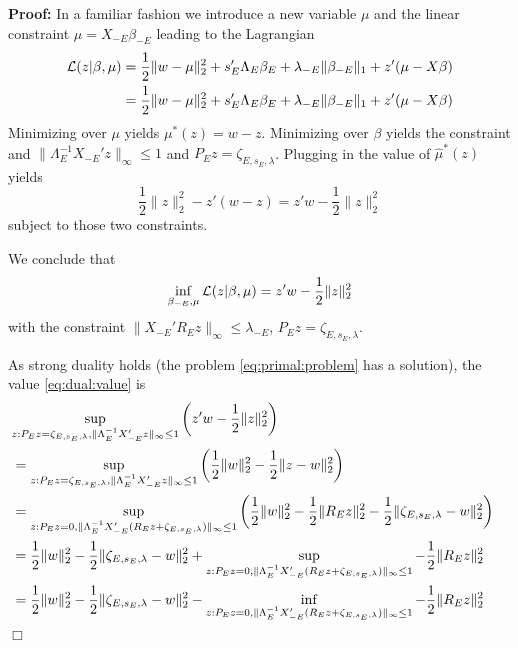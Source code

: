\documentclass{article}
\def\qed{\hfill $\Box$\newline}
\begin{document}
        {\bf Proof:} In a familiar fashion we introduce a new variable
        $\mu$ and the linear constraint $\mu=X_{-E}\beta_{-E}$ leading
        to the Lagrangian
        $$
        \begin{aligned}
        {\cal L}(z|\beta,\mu) &= \frac{1}{2} \|w-\mu\|^2_2 +
        s_E'\Lambda_E\beta_E + \lambda_{-E} \|\beta_{-E}\|_1 +
        z'(\mu-X\beta) \\ &= \frac{1}{2} \|w-\mu\|^2_2 +
        s_E'\Lambda_E\beta_E + \lambda_{-E} \|\beta_{-E}\|_1 +
        z'(\mu-X\beta) \\
        \end{aligned}
        $$ Minimizing over $\mu$ yields $\mu^*(z)=w-z$. Minimizing
        over $\beta$ yields the constraint and
        $\|\Lambda_E^{-1}X_{-E}'z\|_{\infty} \leq 1$ and
        $P_Ez=\zeta_{E,s_E,\lambda}$.  Plugging in the value of
        $\hat{\mu}^*(z)$ yields
        $$ \frac{1}{2}\|z\|^2_2 - z'(w-z) = z'w - \frac{1}{2}\|z\|^2_2
        $$ subject to those two constraints.

        We conclude that
        $$ \inf_{\beta_{-E},\mu}{\cal L}(z|\beta,\mu) = z'w -
        \frac{1}{2}\|z\|^2_2
        $$ with the constraint $\|X_{-E}'R_Ez\|_{\infty} \leq
        \lambda_{-E}$, $P_Ez=\zeta_{E,s_E,\lambda}$.

        As strong duality holds (the problem \eqref{eq:primal:problem}
        has a solution), the value \eqref{eq:dual:value} is
        $$
        \begin{aligned}
          \lefteqn{\sup_{z: P_Ez=\zeta_{E,s_E,\lambda},
              \|\Lambda_E^{-1}X_{-E}'z\|_{\infty} \leq 1} \left(z'w -
            \frac{1}{2}\|z\|^2_2 \right)} \\ &= \sup_{z:
            P_Ez=\zeta_{E,s_E,\lambda}, \|\Lambda_E^{-1}X_{-E}'z\|_{\infty}
            \leq 1} \left( \frac{1}{2}\|w\|^2_2 -
          \frac{1}{2}\|z-w\|^2_2 \right) \\ &= \sup_{z: P_Ez=0,
            \|\Lambda_E^{-1}X_{-E}'(R_Ez+\zeta_{E,s_E,\lambda})\|_{\infty}
            \leq 1} \left( \frac{1}{2}\|w\|^2_2 -
          \frac{1}{2}\|R_Ez\|^2_2 - \frac{1}{2}\|\zeta_{E,s_E,\lambda}-w\|^2_2
          \right) \\ &= \frac{1}{2} \|w\|^2_2 -
          \frac{1}{2}\|\zeta_{E,s_E,\lambda}-w\|^2_2 + \sup_{z: P_Ez=0,
            \|\Lambda_E^{-1}X_{-E}'(R_Ez+\zeta_{E,s_E,\lambda})\|_{\infty}
            \leq 1} -\frac{1}{2}\|R_Ez\|^2_2 \\ &= \frac{1}{2}
          \|w\|^2_2 - \frac{1}{2}\|\zeta_{E,s_E,\lambda}-w\|^2_2 - \inf_{z:
            P_Ez=0,
            \|\Lambda_E^{-1}X_{-E}'(R_Ez+\zeta_{E,s_E,\lambda})\|_{\infty}
            \leq 1} -\frac{1}{2}\|R_Ez\|^2_2 \\
        \end{aligned}
        $$ \qed
\end{document}
